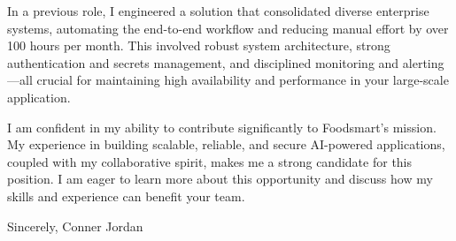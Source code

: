 \documentclass[letterpaper,11pt]{article}
\begin{document}
In a previous role, I engineered a solution that consolidated diverse enterprise systems, automating the end-to-end workflow and reducing manual effort by over 100 hours per month.  This involved robust system architecture, strong authentication and secrets management, and disciplined monitoring and alerting—all crucial for maintaining high availability and performance in your large-scale application.

\vspace{16pt}

I am confident in my ability to contribute significantly to Foodsmart's mission. My experience in building scalable, reliable, and secure AI-powered applications, coupled with my collaborative spirit, makes me a strong candidate for this position. I am eager to learn more about this opportunity and discuss how my skills and experience can benefit your team.

\vspace{16pt}

Sincerely,  
Conner Jordan
\end{document}
